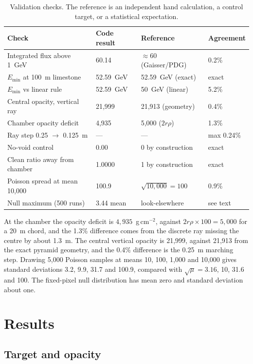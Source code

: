 \documentclass{article}
\begin{document}
\begin{table}[t]
\centering
\caption{Validation checks. The reference is an independent hand calculation,
a control target, or a statistical expectation.}
\label{tab:validation}
\small
\begin{tabular}{@{}p{4.2cm}p{2.8cm}p{3.2cm}p{2.3cm}@{}}
\toprule
Check & Code result & Reference & Agreement \\
\midrule
Integrated flux above 1~GeV & 60.14 & $\approx60$ (Gaisser/PDG) & 0.2\% \\
$E_{\min}$ at 100~m limestone & 52.59~GeV & 52.59~GeV (exact) & exact \\
$E_{\min}$ vs linear rule & 52.59~GeV & 50~GeV (linear) & 5.2\% \\
Central opacity, vertical ray & 21{,}999 & 21{,}913 (geometry) & 0.4\% \\
Chamber opacity deficit & 4{,}935 & 5{,}000 ($2r\rho$) & 1.3\% \\
Ray step 0.25 $\to$ 0.125~m & --- & --- & max 0.24\% \\
No-void control & 0.00 & 0 by construction & exact \\
Clean ratio away from chamber & 1.0000 & 1 by construction & exact \\
Poisson spread at mean 10{,}000 & 100.9 & $\sqrt{10{,}000}=100$ & 0.9\% \\
Null maximum (500 runs) & 3.44 mean & look-elsewhere & see text \\
\bottomrule
\end{tabular}
\end{table}

At the chamber the
opacity deficit is $4{,}935$~g\,cm$^{-2}$, against
$2r\rho\times100=5{,}000$ for a 20~m chord, and the 1.3\% difference comes from the
discrete ray missing the centre by about 1.3~m. The central vertical opacity is
21,999, against 21,913 from the exact pyramid geometry, and the 0.4\% difference is
the 0.25~m marching step. Drawing 5,000 Poisson samples at means 10, 100, 1,000
and 10,000 gives standard deviations 3.2, 9.9, 31.7 and 100.9, compared with
$\sqrt{\mu}=3.16$, 10, 31.6 and 100. The fixed-pixel null distribution has mean
zero and standard deviation about one.


\section{Results}
\label{sec:results}

\subsection{Target and opacity}
\end{document}
